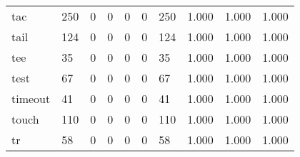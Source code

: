 \begin{longtable}{lp{2.0cm}p{2.0cm}p{2.0cm}p{2.0cm}p{2.0cm}p{2.0cm}p{2.0cm}p{2.0cm}p{2.0cm}}
tac       &                    250 &                                             0 &                                            0 &                                           0 &                                            0 &                                        250 &                                1.000 &                                  1.000 &                                1.000 \\
tail      &                    124 &                                             0 &                                            0 &                                           0 &                                            0 &                                        124 &                                1.000 &                                  1.000 &                                1.000 \\
tee       &                     35 &                                             0 &                                            0 &                                           0 &                                            0 &                                         35 &                                1.000 &                                  1.000 &                                1.000 \\
test      &                     67 &                                             0 &                                            0 &                                           0 &                                            0 &                                         67 &                                1.000 &                                  1.000 &                                1.000 \\
timeout   &                     41 &                                             0 &                                            0 &                                           0 &                                            0 &                                         41 &                                1.000 &                                  1.000 &                                1.000 \\
touch     &                    110 &                                             0 &                                            0 &                                           0 &                                            0 &                                        110 &                                1.000 &                                  1.000 &                                1.000 \\
tr        &                     58 &                                             0 &                                            0 &                                           0 &                                            0 &                                         58 &                                1.000 &                                  1.000 &                                1.000 \\

\end{longtable}
